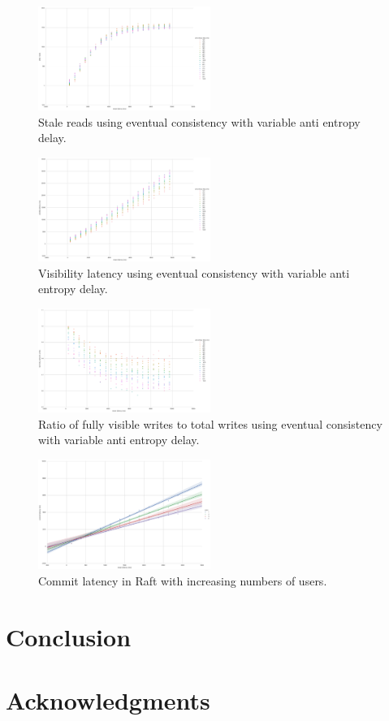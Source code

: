 \documentclass[letterpaper,twocolumn,10pt]{article}
\begin{document}
\begin{figure}[h]
    \centering
    \includegraphics[width=0.5\textwidth]{figures/ae_stale_reads}
    \caption{Stale reads using eventual consistency with variable anti entropy delay.}
\end{figure}

\begin{figure}[h]
    \centering
    \includegraphics[width=0.5\textwidth]{figures/ae_viz_latency}
    \caption{Visibility latency using eventual consistency with variable anti entropy delay.}
\end{figure}

\begin{figure}[h]
    \centering
    \includegraphics[width=0.5\textwidth]{figures/ae_viz_ratio}
    \caption{Ratio of fully visible writes to total writes using eventual consistency with variable anti entropy delay.}
\end{figure}

\begin{figure}[h]
    \centering
    \includegraphics[width=0.5\textwidth]{figures/raft_commit_latency}
    \caption{Commit latency in Raft with increasing numbers of users.}
\end{figure}

\section{Conclusion}

\section*{Acknowledgments}

{\footnotesize 
}

\end{document}
